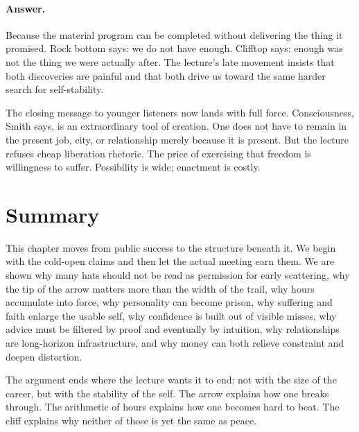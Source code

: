 \paragraph{Answer.}
Because the material program can be completed without delivering the thing it promised. Rock bottom says: we do not have enough. Clifftop says: enough was not the thing we were actually after. The lecture's late movement insists that both discoveries are painful and that both drive us toward the same harder search for self-stability.

The closing message to younger listeners now lands with full force. Consciousness, Smith says, is an extraordinary tool of creation. One does not have to remain in the present job, city, or relationship merely because it is present. But the lecture refuses cheap liberation rhetoric. The price of exercising that freedom is willingness to suffer. Possibility is wide; enactment is costly.

\section{Summary}

This chapter moves from public success to the structure beneath it. We begin with the cold-open claims and then let the actual meeting earn them. We are shown why many hats should not be read as permission for early scattering, why the tip of the arrow matters more than the width of the trail, why hours accumulate into force, why personality can become prison, why suffering and faith enlarge the usable self, why confidence is built out of visible misses, why advice must be filtered by proof and eventually by intuition, why relationships are long-horizon infrastructure, and why money can both relieve constraint and deepen distortion.

The argument ends where the lecture wants it to end: not with the size of the career, but with the stability of the self. The arrow explains how one breaks through. The arithmetic of hours explains how one becomes hard to beat. The cliff explains why neither of those is yet the same as peace.
